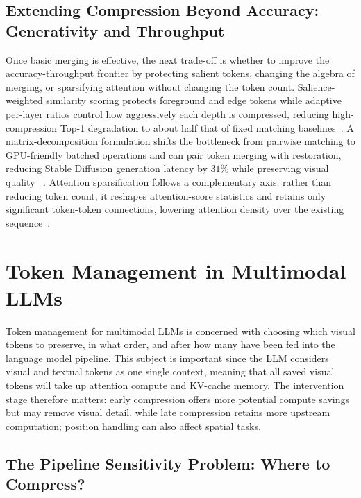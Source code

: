 \documentclass[10pt]{article}
\begin{document}
\subsection{Extending Compression Beyond Accuracy: Generativity and Throughput}

Once basic merging is effective, the next trade-off is whether to improve the
accuracy-throughput frontier by protecting salient tokens, changing the algebra of
merging, or sparsifying attention without changing the token count.  Salience-weighted
similarity scoring protects foreground and edge tokens while adaptive per-layer ratios
control how aggressively each depth is compressed, reducing high-compression Top-1
degradation to about half that of fixed matching baselines~\citep{lee2026adamergesalienceawareadaptivetoken}.  A
matrix-decomposition formulation shifts the bottleneck from pairwise matching to
GPU-friendly batched operations and can pair token merging with restoration, reducing
Stable Diffusion generation latency by $31\%$ while preserving visual quality
~\citep{huo2026mamemarematrixbased}.  Attention sparsification follows a complementary axis: rather than
reducing token count, it reshapes attention-score statistics and retains only
significant token-token connections, lowering attention density over the existing
sequence~\citep{chen2025rettentionultrasparsevisual}.

\section{Token Management in Multimodal LLMs}
\label{sec:mlhm}

Token management for multimodal LLMs is concerned with choosing which visual tokens
to preserve, in what order, and after how many have been fed into the language model
pipeline. This subject is important since the LLM considers visual and textual tokens
as one single context, meaning that all saved visual tokens will take up attention
compute and KV-cache memory.  The intervention stage therefore matters: early
compression offers more potential compute savings but may remove visual detail, while
late compression retains more upstream computation; position handling can also affect
spatial tasks.

\subsection{The Pipeline Sensitivity Problem: Where to Compress?}
\end{document}
